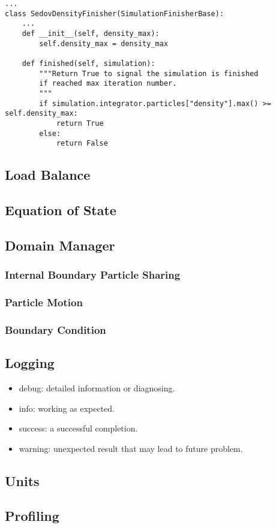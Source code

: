 \begin{lstlisting}
...
class SedovDensityFinisher(SimulationFinisherBase):
    ...
    def __init__(self, density_max):
        self.density_max = density_max

    def finished(self, simulation):
        """Return True to signal the simulation is finished
        if reached max iteration number.
        """
        if simulation.integrator.particles["density"].max() >= self.density_max:
            return True
        else:
            return False

\end{lstlisting}

\subsection{Load Balance}

\subsection{Equation of State}

\subsection{Domain Manager}
\subsubsection{Internal Boundary Particle Sharing}
\subsubsection{Particle Motion}
\subsubsection{Boundary Condition}

\subsection{Logging}
\label{sec.logging}
\begin{itemize}
	\item debug: detailed information or diagnosing.
    \item info: working as expected.
    \item success: a successful completion. 
    \item warning: unexpected result that may lead to future problem.
\end{itemize}

\subsection{Units}

\subsection{Profiling}

